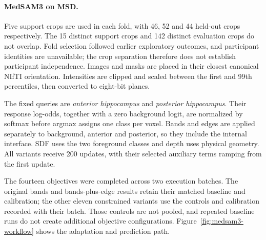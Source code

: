 \documentclass[12pt,a4paper]{article}
\begin{document}
\paragraph{MedSAM3 on MSD.}\label{sec:medsam-methods}
Five support crops are used in each fold, with 46, 52 and 44 held-out
crops respectively. The 15 distinct support crops and 142 distinct
evaluation crops do not overlap. Fold selection followed earlier
exploratory outcomes, and participant identities are unavailable; the
crop separation therefore does not establish participant independence.
Images and masks are placed in their closest canonical NIfTI
orientation. Intensities are clipped and scaled between the first and
99th percentiles, then converted to eight-bit planes.

The fixed queries are \emph{anterior hippocampus} and
\emph{posterior hippocampus}. Their response log-odds, together with a
zero background logit, are normalized by softmax before argmax assigns
one class per voxel. Bands and edges are applied separately to
background, anterior and posterior, so they include the internal
interface. SDF uses the two foreground classes and depth uses physical
geometry. All variants receive 200 updates, with their selected
auxiliary terms ramping from the first update.

The fourteen objectives were completed across two execution batches.
The original bands and bands-plus-edge results retain their matched
baseline and calibration; the other eleven constrained variants use
the controls and calibration recorded with their batch. Those controls
are not pooled, and repeated baseline runs do not create additional
objective configurations.
Figure~\ref{fig:medsam3-workflow} shows the adaptation and prediction
path.
\end{document}
